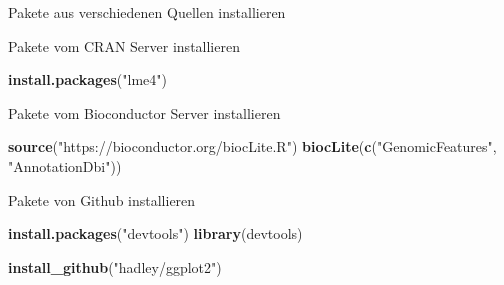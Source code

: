 \documentclass[ignorenonframetext,]{beamer}
\newenvironment{Shaded}{\begin{snugshade}}{\end{snugshade}}
\newcommand{\KeywordTok}[1]{\textcolor[rgb]{0.13,0.29,0.53}{\textbf{#1}}}
\newcommand{\NormalTok}[1]{#1}
\newcommand{\StringTok}[1]{\textcolor[rgb]{0.31,0.60,0.02}{#1}}
\begin{document}
\begin{frame}[fragile]{Pakete aus verschiedenen Quellen installieren}
\protect\hypertarget{pakete-aus-verschiedenen-quellen-installieren}{}

\begin{block}{Pakete vom CRAN Server installieren}

\begin{Shaded}
\begin{Highlighting}[]
\KeywordTok{install.packages}\NormalTok{(}\StringTok{"lme4"}\NormalTok{)}
\end{Highlighting}
\end{Shaded}

\end{block}

\begin{block}{Pakete vom Bioconductor Server installieren}

\begin{Shaded}
\begin{Highlighting}[]
\KeywordTok{source}\NormalTok{(}\StringTok{"https://bioconductor.org/biocLite.R"}\NormalTok{)}
\KeywordTok{biocLite}\NormalTok{(}\KeywordTok{c}\NormalTok{(}\StringTok{"GenomicFeatures"}\NormalTok{, }\StringTok{"AnnotationDbi"}\NormalTok{))}
\end{Highlighting}
\end{Shaded}

\end{block}

\begin{block}{Pakete von Github installieren}

\begin{Shaded}
\begin{Highlighting}[]
\KeywordTok{install.packages}\NormalTok{(}\StringTok{"devtools"}\NormalTok{)}
\KeywordTok{library}\NormalTok{(devtools)}

\KeywordTok{install_github}\NormalTok{(}\StringTok{"hadley/ggplot2"}\NormalTok{)}
\end{Highlighting}
\end{Shaded}

\end{block}

\end{frame}
\end{document}
